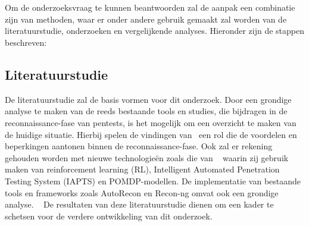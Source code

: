 
\chapter{}%
\label{ch:methodologie}


Om de onderzoeksvraag te kunnen beantwoorden zal de aanpak een combinatie zijn van methoden, waar er onder andere gebruik
gemaakt zal worden van de literatuurstudie, onderzoeken en vergelijkende analyses. Hieronder zijn de stappen beschreven:

\section{Literatuurstudie}

De literatuurstudie zal de basis vormen voor dit onderzoek. Door een grondige analyse te maken van de reeds bestaande tools en studies,
die bijdragen in de reconnaissance-fase van pentests, is het mogelijk om een overzicht te maken van de huidige situatie.
Hierbij spelen de vindingen van~\textcite{Shah,Kothia} een rol die de voordelen en beperkingen aantonen binnen de reconnaissance-fase.
Ook zal er rekening gehouden worden met nieuwe technologieën zoals die van ~\textcite{Ghanem,Hoang} waarin zij gebruik maken van
reinforcement learning (RL), Intelligent Automated Penetration Testing System (IAPTS) en POMDP-modellen. De implementatie van bestaande
tools en frameworks zoals AutoRecon en Recon-ng omvat ook een grondige analyse. ~\autocite{Shebli}
De resultaten van deze literatuurstudie dienen om een kader te schetsen voor de verdere ontwikkeling van dit onderzoek.

